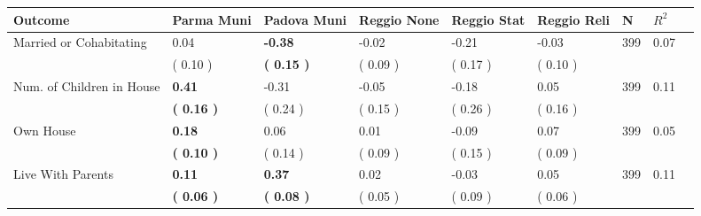 \begin{tabular}{L{6.2cm} C{1.8cm} C{1.8cm} C{1.8cm} C{1.8cm} C{1.8cm} C{1.8cm} C{0.3cm} C{0.3cm}}
\toprule
 \textbf{Outcome} & \textbf{Parma Muni} & \textbf{Padova Muni} & \textbf{Reggio None} & \textbf{Reggio Stat} & \textbf{Reggio Reli} & \textbf{N} & \textbf{$ R^2$} \\
\midrule
Married or Cohabitating &      0.04 & \textbf{    -0.38} &     -0.02 &     -0.21 &     -0.03  & 399 &       0.07 \\ 
 & (     0.10 ) & \textbf{(     0.15 )} & (     0.09 ) & (     0.17 ) & (     0.10 )  & \\
Num. of Children in House & \textbf{     0.41} &     -0.31 &     -0.05 &     -0.18 &      0.05  & 399 &       0.11 \\ 
 & \textbf{(     0.16 )} & (     0.24 ) & (     0.15 ) & (     0.26 ) & (     0.16 )  & \\
Own House & \textbf{     0.18} &      0.06 &      0.01 &     -0.09 &      0.07  & 399 &       0.05 \\ 
 & \textbf{(     0.10 )} & (     0.14 ) & (     0.09 ) & (     0.15 ) & (     0.09 )  & \\
Live With Parents & \textbf{     0.11} & \textbf{     0.37} &      0.02 &     -0.03 &      0.05  & 399 &       0.11 \\ 
 & \textbf{(     0.06 )} & \textbf{(     0.08 )} & (     0.05 ) & (     0.09 ) & (     0.06 )  & \\
\bottomrule
\end{tabular}

